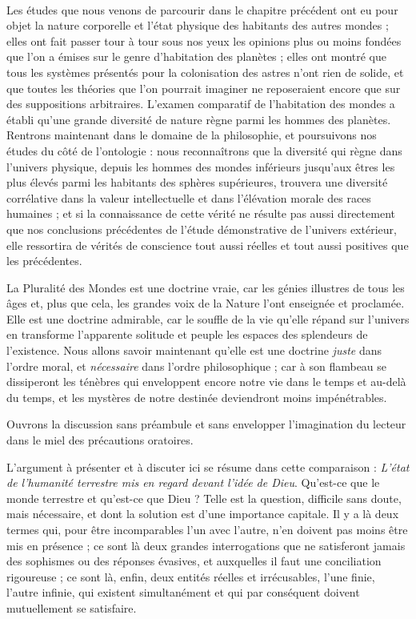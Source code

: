 \documentclass[a4paper, 11pt, oneside]{article}
\begin{document}
\paragraph{}
Les études que nous venons de parcourir dans le chapitre précédent ont eu pour objet la nature corporelle et l'état physique des habitants des autres mondes ; elles ont fait passer tour à tour sous nos yeux les opinions plus ou moins fondées que l'on a émises sur le genre d'habitation des planètes ; elles ont montré que tous les systèmes présentés pour la colonisation des astres n'ont rien de solide, et que toutes les théories que l'on pourrait imaginer ne reposeraient encore que sur des suppositions arbitraires. L'examen comparatif de l'habitation des mondes a établi qu'une grande diversité de nature règne parmi les hommes des planètes. Rentrons maintenant dans le domaine de la philosophie, et poursuivons nos études du côté de l'ontologie : nous reconnaîtrons que la diversité qui règne dans l'univers physique, depuis les hommes des mondes inférieurs jusqu'aux êtres les plus élevés parmi les habitants des sphères supérieures, trouvera une diversité corrélative dans la valeur intellectuelle et dans l'élévation morale des races humaines ; et si la connaissance de cette vérité ne résulte pas aussi directement que nos conclusions précédentes de l'étude démonstrative de l'univers extérieur, elle ressortira de vérités de conscience tout aussi réelles et tout aussi positives que les précédentes.

La Pluralité des Mondes est une doctrine vraie, car les génies illustres de tous les âges et, plus que cela, les grandes voix de la Nature l'ont enseignée et proclamée. Elle est une doctrine admirable, car le souffle de la vie qu'elle répand sur l'univers en transforme l'apparente solitude et peuple les espaces des splendeurs de l'existence. Nous allons savoir maintenant qu'elle est une doctrine \emph{juste} dans l'ordre moral, et \emph{nécessaire} dans l'ordre philosophique ; car à son flambeau se dissiperont les ténèbres qui enveloppent encore notre vie dans le temps et au-delà du temps, et les mystères de notre destinée deviendront moins impénétrables.

Ouvrons la discussion sans préambule et sans envelopper l'imagination du lecteur dans le miel des précautions oratoires.

L'argument à présenter et à discuter ici se résume dans cette comparaison : \emph{L'état de l'humanité terrestre mis en regard devant l'idée de Dieu}. Qu'est-ce que le monde terrestre et qu'est-ce que Dieu ? Telle est la question, difficile sans doute, mais nécessaire, et dont la solution est d'une importance capitale. Il y a là deux termes qui, pour être incomparables l'un avec l'autre, n'en doivent pas moins être mis en présence ; ce sont là deux grandes interrogations que ne satisferont jamais des sophismes ou des réponses évasives, et auxquelles il faut une conciliation rigoureuse ; ce sont là, enfin, deux entités réelles et irrécusables, l'une finie, l'autre infinie, qui existent simultanément et qui par conséquent doivent mutuellement se satisfaire.
\end{document}
